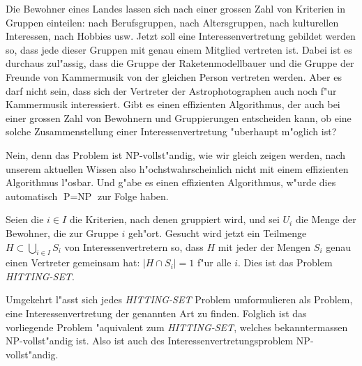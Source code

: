 Die Bewohner eines Landes lassen sich nach einer grossen Zahl
von Kriterien in Gruppen einteilen: nach Berufsgruppen, nach
Altersgruppen, nach kulturellen Interessen, nach Hobbies usw.
Jetzt soll eine Interessenvertretung gebildet werden so, dass
jede dieser Gruppen mit genau einem Mitglied vertreten ist.
Dabei ist es durchaus zul"assig, dass die Gruppe der Raketenmodellbauer
und die Gruppe der Freunde von Kammermusik von der gleichen Person
vertreten werden. Aber es darf nicht sein, dass sich der Vertreter
der Astrophotographen auch noch f"ur Kammermusik interessiert.
Gibt es einen effizienten Algorithmus, der auch bei einer grossen
Zahl von Bewohnern und Gruppierungen entscheiden kann, ob eine
solche Zusammenstellung einer Interessenvertretung "uberhaupt
m"oglich ist?

\begin{loesung}
Nein, denn das Problem ist NP-vollst"andig, wie wir gleich
zeigen werden, nach unserem aktuellen
Wissen also h"ochstwahrscheinlich nicht mit einem effizienten
Algorithmus l"osbar. Und g"abe es einen effizienten Algorithmus,
w"urde dies automatisch $\text{P}=\text{NP}$ zur Folge haben.

Seien die $i\in I$ die Kriterien, nach denen gruppiert wird,
und sei $U_i$ die Menge der Bewohner, die zur Gruppe $i$ geh"ort.
Gesucht wird jetzt ein Teilmenge $H\subset\bigcup_{i\in I}S_i$
von Interessenvertretern so, dass $H$ mit jeder der Mengen
$S_i$ genau einen Vertreter gemeinsam hat: $|H\cap S_i|=1$
f"ur alle $i$. Dies ist das Problem {\textsl{HITTING-SET}}. 

Umgekehrt l"asst sich jedes {\textsl{HITTING-SET}} Problem umformulieren
als Problem, eine Interessenvertretung der genannten Art zu finden.
Folglich ist das vorliegende Problem "aquivalent zum {\textsl{HITTING-SET}},
welches bekanntermassen NP-vollst"andig ist. Also ist auch des
Interessenvertretungsproblem NP-vollst"andig.
\end{loesung}
